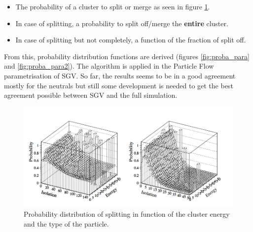 \begin{itemize}
  \item The probability of a cluster to split or merge as seen in figure \ref{fig:proba_split}.
  \item In case of splitting, a probability to split off/merge the \textbf{entire} cluster.
  \item In case of splitting but not completely, a function of the fraction of split off.
\end{itemize}

From this, probability distribution functions are derived (figures \ref{fig:proba_para} and \ref{fig:proba_para2}). The algorithm is applied in the Particle Flow parametrisation of SGV. So far, the results seems to be in a good agreement mostly for the neutrals but still some development is needed to get the best agreement possible between SGV and the full simulation.

\begin{figure}[t]
  \centering
  \includegraphics[width=1\linewidth]{chap6/fig_SGV/prob_split.png}
  \caption{Probability distribution of splitting in function of the cluster energy and the type of the particle.}
  \label{fig:proba_split}
\end{figure}

